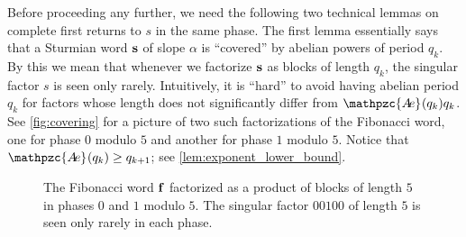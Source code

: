 \documentclass[a4paper,fleqn]{article}
\newcommand{\infw}[1]{%
  \ifcat\noexpand#1\relax\bm{#1}%
  \else\mathbf{#1}\fi}          %
\newcommand{\abexp}[2][]{\mathpzc{A\mkern-3mu e}_{#1}(#2)}
\begin{document}
  Before proceeding any further, we need the following two technical lemmas on complete first returns to $s$ in the
  same phase. The first lemma essentially says that a Sturmian word $\infw{s}$ of slope $\alpha$ is ``covered'' by
  abelian powers of period $q_k$. By this we mean that whenever we factorize $\infw{s}$ as blocks of length $q_k$, the
  singular factor $s$ is seen only rarely. Intuitively, it is ``hard'' to avoid having abelian period $q_k$ for factors
  whose length does not significantly differ from $\abexp{q_k}q_k$. See \autoref{fig:covering} for a picture of two
  such factorizations of the Fibonacci word, one for phase $0$ modulo $5$ and another for phase $1$ modulo $5$. Notice
  that $\abexp{q_k} \geq q_{k+1}$; see \autoref{lem:exponent_lower_bound}.

  \begin{figure}
  \centering
  \caption{The Fibonacci word $\infw{f}$ factorized as a product of blocks of length $5$ in phases $0$ and $1$ modulo $5$. The singular factor $00100$ of length $5$ is seen only rarely in each phase.}
  \label{fig:covering}
  \end{figure}
\end{document}

